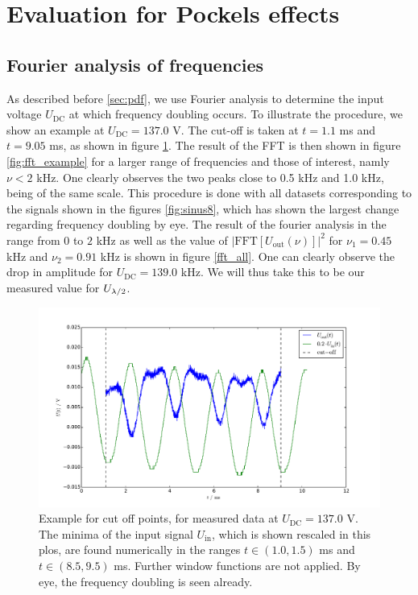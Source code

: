 \section{Evaluation for Pockels effects}
\subsection{Fourier analysis of frequencies}
As described before \ref{sec:pdf}, we use Fourier analysis to determine 
the input voltage $U_\mathrm{DC}$ at which frequency doubling occurs. 
To illustrate the procedure, we show an example at $U_\mathrm{DC} = 137.0$ V.
The cut-off is taken at $t = 1.1$ ms and $t = 9.05$ ms, as shown in figure 
\ref{fig:cut_off_example}. The result of the FFT is then shown in figure 
\ref{fig:fft_example} for a larger range of frequencies and those of interest, 
namly $\nu < 2$ kHz. One clearly observes the two peaks close to 
0.5 kHz and 1.0 kHz, being of the same scale. This procedure is 
done with all datasets corresponding to the signals shown in 
the figures \ref{fig:sinus8}, which has shown the largest 
change regarding frequency doubling by eye. The result of the fourier 
analysis in the range from $0$ to $2$ kHz as well as the 
value of $|\mathrm{FFT}\left[U_\mathrm{out} \left(\nu\right)\right]|^2$ for 
$\nu_1 = 0.45$ kHz and $\nu_2 = 0.91$ kHz 
is shown in figure \ref{fft_all}.
One can clearly observe the drop in amplitude for $U_\mathrm{DC} = 139.0$ kHz. 
We will thus take this to be our measured value for $U_{\lambda/2}$.
\begin{figure}
\includegraphics[width=\pltw]{figures/cut_off_example.pdf}
\caption{
    Example for cut off points, for measured data at 
    $U_\mathrm{DC} = 137.0$ V. The minima of the input 
    signal $U_\mathrm{in}$, which is shown rescaled in this plos, 
    are found numerically in the ranges 
    $t \in (1.0, 1.5)$ ms and $t \in (8.5, 9.5)$ ms. 
    Further window functions are not applied. 
    By eye, the frequency doubling is seen already. 
    }
\label{fig:cut_off_example}
\end{figure}


